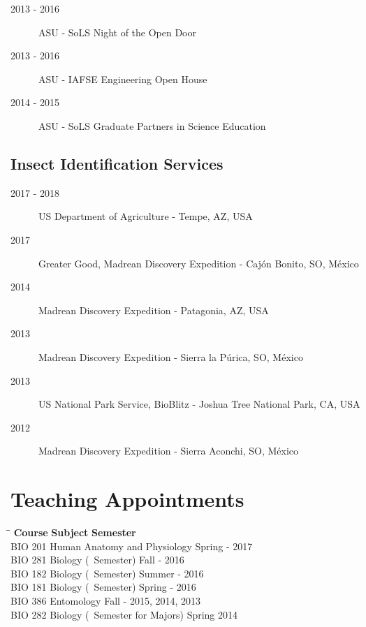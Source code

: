 \documentclass[12pt,a4paper]{article}
\begin{document}
		\begin{description}
			\item [2013 - 2016] ASU - SoLS Night of the Open Door
			\item [2013 - 2016] ASU - IAFSE Engineering Open House
			\item [2014 - 2015] ASU - SoLS Graduate Partners in Science Education
		\end{description}
		
	\subsection*{Insect Identification Services}
	
		\begin{description}
			\item [2017 - 2018] US Department of Agriculture - Tempe, AZ, USA
			\item [2017] Greater Good, Madrean Discovery Expedition - Caj\'{o}n Bonito, SO, M\'{e}xico
			\item [2014] Madrean Discovery Expedition - Patagonia, AZ, USA
			\item [2013] Madrean Discovery Expedition - Sierra la P\'{u}rica, SO, M\'{e}xico
			\item [2013] US National Park Service, BioBlitz - Joshua Tree National Park, CA, USA
			\item [2012] Madrean Discovery Expedition - Sierra Aconchi, SO, M\'{e}xico
		\end{description}

\section*{Teaching Appointments}

	\begin{tabbing}
	\hspace{2cm}\=\hspace{6.5cm}\=\kill
	\textbf{Course} \> \textbf{Subject} \> \textbf{Semester} \\
	BIO 201 \> Human Anatomy and Physiology \> Spring - 2017 \\ 
	BIO 281 \> Biology (~Semester) \> Fall - 2016 \\ 
	BIO 182 \> Biology (~Semester) \> Summer - 2016 \\ 
	BIO 181 \> Biology (~Semester) \> Spring - 2016 \\ 
	BIO 386 \> Entomology \> Fall - 2015, 2014, 2013 \\ 
	BIO 282 \> Biology (~Semester for Majors) \> Spring 2014
	\end{tabbing} 
\end{document}

